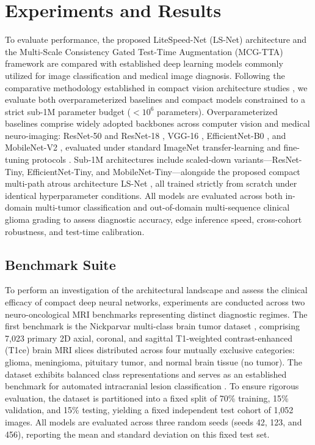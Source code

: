 \section{Experiments and Results}

To evaluate performance, the proposed LiteSpeed-Net (LS-Net) architecture and the Multi-Scale Consistency Gated Test-Time Augmentation (MCG-TTA) framework are compared with established deep learning models commonly utilized for image classification and medical image diagnosis. Following the comparative methodology established in compact vision architecture studies \cite{21}, we evaluate both overparameterized baselines and compact models constrained to a strict sub-1M parameter budget ($<10^6$ parameters). Overparameterized baselines comprise widely adopted backbones across computer vision and medical neuro-imaging: ResNet-50 and ResNet-18 \cite{14}, VGG-16 \cite{39}, EfficientNet-B0 \cite{40}, and MobileNet-V2 \cite{37}, evaluated under standard ImageNet transfer-learning and fine-tuning protocols \cite{10, 54, 55}. Sub-1M architectures include scaled-down variants---ResNet-Tiny, EfficientNet-Tiny, and MobileNet-Tiny---alongside the proposed compact multi-path atrous architecture LS-Net \cite{21}, all trained strictly from scratch under identical hyperparameter conditions. All models are evaluated across both in-domain multi-tumor classification and out-of-domain multi-sequence clinical glioma grading to assess diagnostic accuracy, edge inference speed, cross-cohort robustness, and test-time calibration.

\subsection{Benchmark Suite}

To perform an investigation of the architectural landscape and assess the clinical efficacy of compact deep neural networks, experiments are conducted across two neuro-oncological MRI benchmarks representing distinct diagnostic regimes. The first benchmark is the Nickparvar multi-class brain tumor dataset \cite{34}, comprising 7,023 primary 2D axial, coronal, and sagittal T1-weighted contrast-enhanced (T1ce) brain MRI slices distributed across four mutually exclusive categories: glioma, meningioma, pituitary tumor, and normal brain tissue (no tumor). The dataset exhibits balanced class representations and serves as an established benchmark for automated intracranial lesion classification \cite{34, 55}. To ensure rigorous evaluation, the dataset is partitioned into a fixed split of 70\% training, 15\% validation, and 15\% testing, yielding a fixed independent test cohort of 1,052 images. All models are evaluated across three random seeds (seeds 42, 123, and 456), reporting the mean and standard deviation on this fixed test set.

